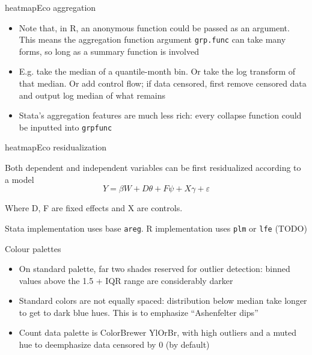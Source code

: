 \begin{frame}{heatmapEco aggregation}
        \begin{itemize}
                \item<1-> Note that, in R, an anonymous function could be passed as an argument.
        This means the aggregation function argument \texttt{grp.func} can take
        many forms, so long as a summary function is involved
                \item<1->  E.g. take the median of a quantile-month bin. Or take the log transform
        of that median. Or add control flow; if data censored, first remove
        censored data and output log median of what remains
        \item<2->Stata's aggregation features are much less rich: every collapse
        function could be inputted into \texttt{grpfunc}
        \end{itemize}


\end{frame}


\begin{frame}{heatmapEco residualization}

        Both dependent and independent variables can be first residualized according to a model
        $$ Y = \beta W + D\theta + F\psi + X\gamma + \varepsilon $$

        Where D, F are fixed effects and X are controls.

        Stata implementation uses base \texttt{areg}. R implementation uses
        \texttt{plm} or \texttt{lfe} (TODO)
\end{frame}

\begin{frame}{Colour palettes}

    \centering

\footnotesize

    \begin{itemize}
            \item On standard palette, far two shades reserved for outlier detection: binned values above the 1.5 + IQR range are considerably darker
            \item Standard colors are not equally spaced: distribution below median take longer to get to dark blue hues. This is to emphasize ``Ashenfelter dips''
            \item Count data palette is ColorBrewer YlOrBr, with high outliers and
            a muted hue to deemphasize data censored by 0 (by default)
    \end{itemize}
\end{frame}

